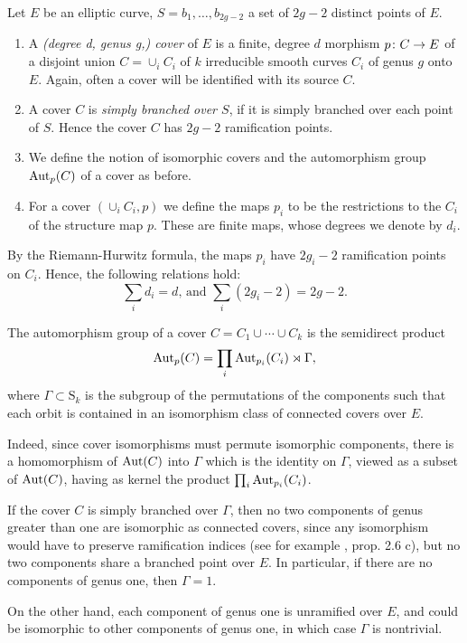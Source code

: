 \begin{defi} Let $E$ be an elliptic curve, $S={b_1,\dotsc,b_{2g-2}}$ a set of $2g-2$ distinct points of $E$.
 \begin{enumerate}
  \item A \emph{(degree d, genus g,) cover} of $E$ is a finite, degree $d$ morphism $p\colon C\to E$ of a disjoint union $C=\cup_i C_i$ of $k$ irreducible smooth curves $C_i$ of genus $g$ onto $E$. Again, often a cover will be identified with its source $C$.
  
  \item A cover $C$ is \emph{simply branched over $S$}, if it is simply branched over each point of $S$. Hence the cover $C$ has $2g-2$ ramification points.
  
  \item We define the notion of isomorphic covers and the automorphism group $\operatorname{Aut}_p(C)$ of a cover as before.

  \item For a cover $(\cup_i C_i,p)$ we define the maps $p_i$ to be the restrictions to the $C_i$ of the structure map $p$. These are finite maps, whose degrees we denote by $d_i$.
 \end{enumerate}
\end{defi}

\begin{rmk}
 By the Riemann-Hurwitz formula, the maps $p_i$ have $2g_i-2$ ramification points on $C_i$. Hence, the following relations hold:
 \[\sum_i d_i=d\text{, and }\sum_i (2g_i-2)=2g-2.\]
\end{rmk}

\begin{rmk}
 The automorphism group of a cover $C=C_1 \cup \dotsb \cup C_k$ is the semidirect product \[\operatorname{Aut}_p(C) = \prod_i \operatorname{Aut}_{p_i}(C_i) \rtimes \Gamma,\] where $\Gamma \subset \mathrm{S}_k$ is the subgroup of the permutations of the components such that each orbit is contained in an isomorphism class of connected covers over $E$.
 
 Indeed, since cover isomorphisms must permute isomorphic components, there is a homomorphism of $\operatorname{Aut}(C)$ into $\Gamma$ which is the identity on $\Gamma$, viewed as a subset of $\operatorname{Aut}(C)$, having as kernel the product $\prod_i \operatorname{Aut}_{p_i}(C_i)$.
 
 If the cover $C$ is simply branched over $\Gamma$, then no two components of genus greater than one are isomorphic as connected covers, since any isomorphism would have to preserve ramification indices (see for example \cite{Silverman2009}, prop. 2.6 c), but no two components share a branched point over $E$. In particular, if there are no components of genus one, then $\Gamma=1$.
 
 On the other hand, each component of genus one is unramified over $E$, and could be isomorphic to other components of genus one, in which case $\Gamma$ is nontrivial.
\end{rmk}

